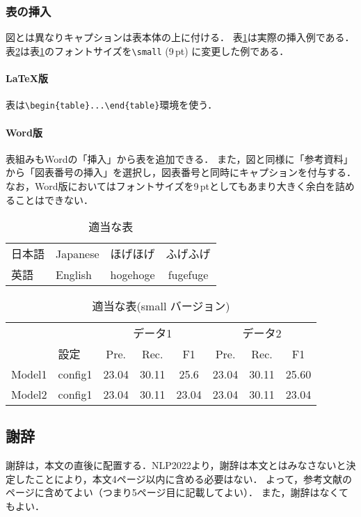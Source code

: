 \documentclass[
  platex, dvipdfmx,  %
]{nlp2025}
\begin{document}
\subsubsection{表の挿入}
図とは異なりキャプションは表本体の上に付ける．
表\ref{tab:sample1}は実際の挿入例である．
表\ref{tab:sample2}は表\ref{tab:sample1}のフォントサイズを\verb|\small| (9\,pt) に変更した例である．



\paragraph{LaTeX版}
表は\verb|\begin{table}...\end{table}|環境を使う．

\paragraph{Word版}
表組みもWordの「挿入」から表を追加できる．
また，図と同様に「参考資料」から「図表番号の挿入」を選択し，図表番号と同時にキャプションを付与する．
なお，Word版においてはフォントサイズを9\,ptとしてもあまり大きく余白を詰めることはできない．

\begin{table}[t]
\centering
\caption{適当な表}
\label{tab:sample1}
\begin{tabular}{llcc}
\hline
日本語 & Japanese & ほげほげ & ふげふげ\\
英語 & English & hogehoge & fugefuge\\
\hline
\end{tabular}
\end{table}
%
\begin{table}[t]
\centering
\small
\tabcolsep 3pt
\caption{適当な表(small バージョン)}
\label{tab:sample2}
\begin{tabular}{llcccccc}
\hline
\      &      &\multicolumn{3}{c}{データ1}&\multicolumn{3}{c}{データ2}\\
\      & 設定 & Pre. & Rec. &F1 & Pre. & Rec. &F1\\
\hline
Model1 & config1 & 23.04 & 30.11 &  25.6 & 23.04 & 30.11 &  25.60\\
Model2 & config1 & 23.04 & 30.11 & 23.04 & 23.04 & 30.11 & 23.04 \\
\hline
\end{tabular}
\end{table}




\subsection{謝辞}
謝辞は，本文の直後に配置する．NLP2022より，謝辞は本文とはみなさないと決定したことにより，本文4ページ以内に含める必要はない．
よって，参考文献のページに含めてよい（つまり5ページ目に記載してよい）．
また，謝辞はなくてもよい．
\end{document}
